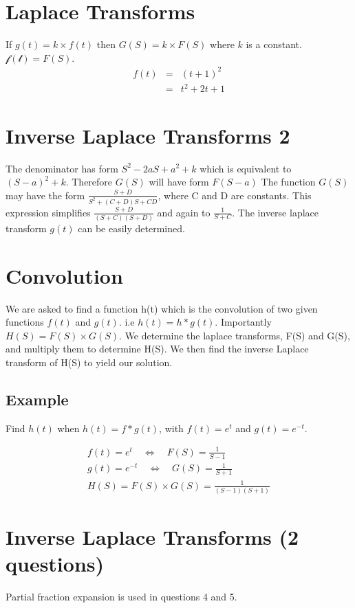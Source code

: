 \documentclass[12pt, a4paper]{article}
\begin{document}
\section{Laplace Transforms }
If $g(t)=k \times f(t)$ then $G(S) = k \times F(S)$ where $k$ is a
constant. $\mathcal{f(t)}=F(S)$.
\begin{eqnarray}
f(t) &=& (t+1)^2\\
&=& t^2 +2t +1 \nonumber
\end{eqnarray}

\section{Inverse Laplace Transforms 2}

The denominator has form $S^2 - 2aS + a^2 + k$ which is equivalent
to $(S-a)^2 + k$. Therefore $G(S)$ will have form $F(S-a)$
\newline
The function $G(S)$ may have the form $\frac{S+D}{S^2 +(C+D)S +
CD}$, where C and D are constants. This expression simplifies
$\frac{S+D}{(S+C)(S+D)}$ and again to $\frac{1}{S+C}$. The inverse
laplace transform $g(t)$ can be easily determined.
\section{Convolution}
We are asked to find a function h(t) which is the convolution of
two given functions $f(t)$ and $g(t)$. i.e $h(t)=h*g(t)$.\newline
Importantly $H(S) = F(S)\times G(S)$. We determine the laplace
transforms, F(S) and G(S), and multiply them to determine H(S). We
then find the inverse Laplace transform of H(S) to yield our
solution.
\subsection{Example}
Find $h(t)$ when $h(t) = f*g(t)$, with $f(t)= e^{t}$ and $g(t)=
e^{-t}$.\newline

\begin{eqnarray}
f(t) = e^{t} \quad \Leftrightarrow \quad F(S)= \frac{1}{S-1}
 \nonumber\\
g(t) = e^{-t} \quad \Leftrightarrow \quad G(S)= \frac{1}{S+1}
 \nonumber\\
H(S) = F(S)\times G(S) = \frac{1}{(S-1)(S+1)}
 \nonumber
\end{eqnarray}



\section{Inverse Laplace Transforms (2 questions) }
Partial fraction expansion is used in questions 4 and 5.
\end{document}
